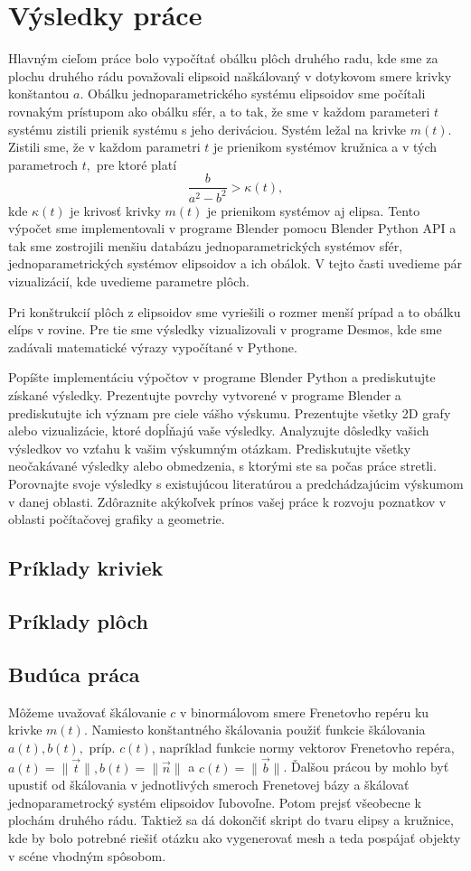 \chapter{Výsledky práce}
Hlavným cieľom práce bolo vypočítať obálku plôch druhého radu, kde sme za plochu druhého rádu považovali elipsoid naškálovaný v dotykovom smere krivky konštantou $a$. Obálku jednoparametrického systému elipsoidov sme počítali rovnakým prístupom ako obálku sfér, a to tak, že sme v každom parameteri $t$ systému zistili prienik systému s jeho deriváciou. Systém ležal na krivke $m(t).$
Zistili sme, že v každom parametri $t$ je prienikom systémov kružnica a v tých parametroch $t,$ pre ktoré platí
$$
\frac{b}{a^2-b^2} > \kappa(t),
$$  
kde $\kappa(t)$ je krivosť krivky $m(t)$ je prienikom systémov aj elipsa.
Tento výpočet sme implementovali v programe Blender pomocu Blender Python API a tak sme zostrojili menšiu databázu jednoparametrických systémov sfér, jednoparametrických systémov elipsoidov a ich obálok. V tejto časti uvedieme pár vizualizácií, kde uvedieme parametre plôch.

Pri konštrukcií plôch z elipsoidov sme vyriešili o rozmer menší prípad a to obálku elíps v rovine. Pre tie sme výsledky vizualizovali v programe Desmos, kde sme zadávali matematické výrazy vypočítané v Pythone. 

Popíšte implementáciu výpočtov v programe Blender Python a prediskutujte získané výsledky.
Prezentujte povrchy vytvorené v programe Blender a prediskutujte ich význam pre ciele vášho výskumu.
Prezentujte všetky 2D grafy alebo vizualizácie, ktoré dopĺňajú vaše výsledky.
Analyzujte dôsledky vašich výsledkov vo vzťahu k vašim výskumným otázkam.
Prediskutujte všetky neočakávané výsledky alebo obmedzenia, s ktorými ste sa počas práce stretli.
Porovnajte svoje výsledky s existujúcou literatúrou a predchádzajúcim výskumom v danej oblasti.
Zdôraznite akýkoľvek prínos vašej práce k rozvoju poznatkov v oblasti počítačovej grafiky a geometrie.

\section{Príklady kriviek}
\section{Príklady plôch}
\section{Budúca práca}
Môžeme uvažovať škálovanie $c$ v binormálovom smere Frenetovho repéru ku krivke $m(t)$. Namiesto konštantného škálovania použiť funkcie škálovania $a(t), b(t),$ príp. $c(t)$, napríklad funkcie normy vektorov Frenetovho repéra, $a(t) = \| \vec{t} \|, b(t) = \| \vec{n} \| $ a $c(t) = \| \vec{b} \|$. Ďalšou prácou by mohlo byť upustiť od škálovania v jednotlivých smeroch Frenetovej bázy a škálovať jednoparametrocký systém elipsoidov ľubovoľne. Potom prejsť všeobecne k plochám druhého rádu.
Taktiež sa dá dokončiť skript do tvaru elipsy a kružnice, kde by bolo potrebné riešiť otázku ako vygenerovať mesh a teda pospájať objekty v scéne vhodným spôsobom.